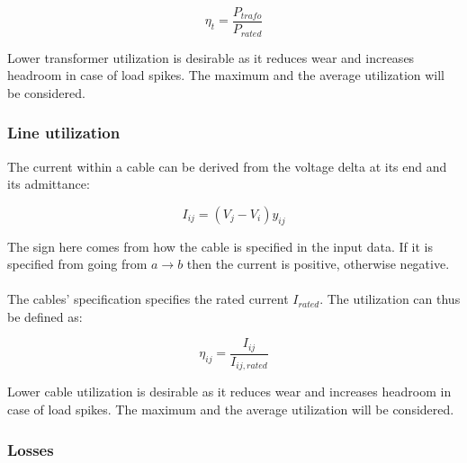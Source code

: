 \begin{equation}
  \eta_t = \frac{P_{trafo}}{P_{rated}}
\end{equation}

Lower transformer utilization is desirable as it reduces wear and increases
headroom in case of load spikes. The maximum and the average utilization
will be considered.

\subsubsection{Line utilization}

The current within a cable can be derived from the voltage delta at its
end and its admittance:

\begin{equation}
  I_{ij} = (V_j - V_i)y_{ij}
\end{equation}

The sign here comes from how the cable is specified in the input data. If it is
specified from going from $a \to b$ then the current is positive, otherwise negative.\\
\\
The cables' specification specifies the rated current $I_{rated}$. The utilization
can thus be defined as:

\begin{equation}
  \eta_{ij} = \frac{I_{ij}}{I_{ij, rated}}
\end{equation}

Lower cable utilization is desirable as it reduces wear and increases
headroom in case of load spikes. The maximum and the average utilization
will be considered.

\subsubsection{Losses}
